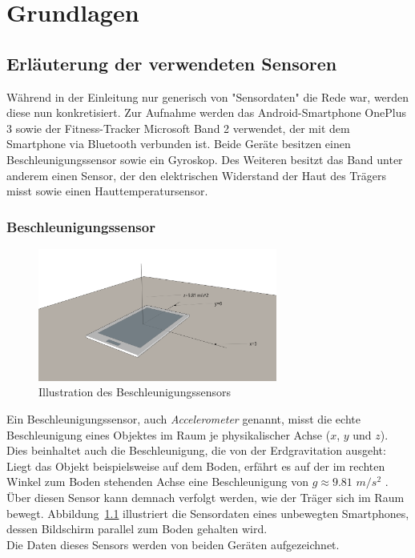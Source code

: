 \chapter{Grundlagen}
\label{chap:background}
\section{Erläuterung der verwendeten Sensoren}
Während in der Einleitung nur generisch von "Sensordaten" die Rede war, werden diese nun konkretisiert. Zur Aufnahme werden das Android-Smartphone OnePlus 3 sowie der Fitness-Tracker Microsoft Band 2 verwendet, der mit dem Smartphone via Bluetooth verbunden ist. Beide Geräte besitzen einen Beschleunigungssensor sowie ein Gyroskop. Des Weiteren besitzt das Band unter anderem einen Sensor, der den elektrischen Widerstand der Haut des Trägers misst sowie einen Hauttemperatursensor.

\subsection{Beschleunigungssensor}
\begin{figure}
\centering
\includegraphics[clip=true,trim=0mm 100mm 100mm 30mm, width=0.7\textwidth]{img/accelerometer}
\caption{Illustration des Beschleunigungssensors}
\label{fig:accelerometer}
\end{figure}
Ein Beschleunigungssensor, auch \textit{Accelerometer} genannt, misst die echte Beschleunigung eines Objektes im Raum je physikalischer Achse ($x$, $y$ und $z$). Dies beinhaltet auch die Beschleunigung, die von der Erdgravitation ausgeht: Liegt das Objekt beispielsweise auf dem Boden, erfährt es auf der im rechten Winkel zum Boden stehenden Achse eine Beschleunigung von $g \approx 9.81$ $m/s^2$ \cite{SensorsOverview, nistsi}. Über diesen Sensor kann demnach verfolgt werden, wie der Träger sich im Raum bewegt. Abbildung~\ref{fig:accelerometer} illustriert die Sensordaten eines unbewegten Smartphones, dessen Bildschirm parallel zum Boden gehalten wird. \\
Die Daten dieses Sensors werden von beiden Geräten aufgezeichnet.

